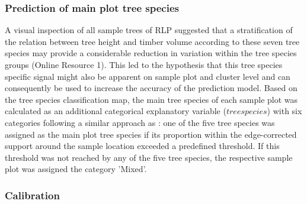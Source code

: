 \subsubsection*{Prediction of main plot tree species}

A visual inspection of all \bwi{} sample trees of RLP suggested that a stratification of the relation between tree height and timber volume according to these seven tree species may provide a considerable reduction in variation within the tree species groups (Online Resource 1). This led to the hypothesis that this tree species specific signal might also be apparent on sample plot and cluster level and can consequently be used to increase the accuracy of the prediction model. Based on the tree species classification map, the main tree species of each sample plot was calculated as an additional categorical explanatory variable ($treespecies$) with six categories following a similar approach as \citet{latifi2012}: one of the five tree species was assigned as the main plot tree species if its proportion within the edge-corrected support around the sample location exceeded a predefined threshold. If this threshold was not reached by any of the five tree species, the respective sample plot was assigned the category 'Mixed'. 
\par


\subsubsection*{Calibration}

